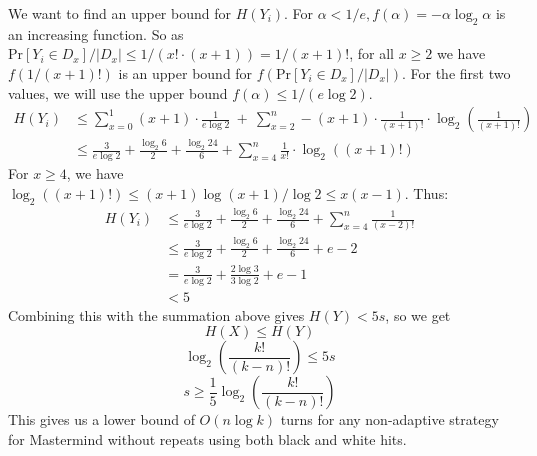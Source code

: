 \documentclass[12pt, a4paper]{article}
\begin{document}
We want to find an upper bound for $H(Y_i)$. For
$\alpha<1/e, f(\alpha)=-\alpha\log_2\alpha$ is an increasing function. So as
$\text{Pr}[Y_i\in D_x]/|D_x|\le 1/(x!\cdot (x+1))=1/(x+1)!$, for all $x\ge 2$ we have
$f(1/(x+1)!)$ is an upper bound for $f(\text{Pr}[Y_i\in D_x]/|D_x|)$. For the first two
values, we will use the upper bound $f(\alpha)\le 1/(e\log2)$.
    \begin{align*}
	H(Y_i)&\le \sum_{x=0}^1 (x+1)\cdot\frac{1}{e\log2}~+~\sum_{x=2}^n -(x+1)\cdot
	\frac{1}{(x+1)!}\cdot \log_2 \left(\frac{1}{(x+1)!}\right)\\
    &\le\frac{3}{e\log2}+\frac{\log_2 6}{2}+\frac{\log_2 24}{6}+\sum_{x=4}^n
    \frac{1}{x!}\cdot \log_2 ((x+1)!)
    \end{align*}
    For $x\ge 4$, we have $\log_2((x+1)!)\le (x+1)\log(x+1)/\log 2\le x(x-1)$. Thus:
    \begin{align*}
	H(Y_i)&\le\frac{3}{e\log2}+\frac{\log_2 6}{2}+\frac{\log_2 24}{6}+\sum_{x=4}^n 
	\frac{1}{(x-2)!}\\
    &\le\frac{3}{e\log2}+\frac{\log_2 6}{2}+\frac{\log_2 24}{6}+e-2\\
    &=\frac{3}{e\log2}+\frac{2\log 3}{3\log 2}+e-1\\
    &<5
    \end{align*}
    Combining this with the summation above gives $H(Y)<5s$, so we get
    \begin{equation*}
    H(X)\le H(Y)
    \end{equation*}
    \begin{equation*}
    \log_2 \left(\frac{k!}{(k-n)!}\right)\le 5s
    \end{equation*}
    \begin{equation*}
    s\ge\frac{1}{5}\log_2 \left(\frac{k!}{(k-n)!}\right)
    \end{equation*}
    \quad
This gives us a lower bound of $O(n\log k)$ turns for any non-adaptive strategy for
Mastermind without repeats using both black and white hits.
\end{document}
